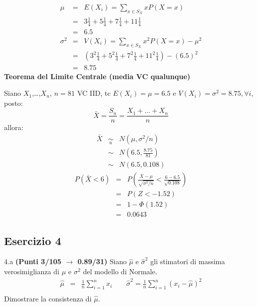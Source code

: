 \documentclass[
  11pt,
]{book}
\theoremstyle{mytheoremstyle}
\theoremstyle{mydefstyle}
\newenvironment{sol}
  {
  \begin{tcolorbox}[enhanced,breakable,arc=0.1mm,boxrule=1pt,colback=white,colframe=iblue,
  title=\bf \fontfamily{lmss}\selectfont \hspace{.5 cm} Soluzione,drop fuzzy shadow]

}{
\end{tcolorbox}
  }
\begin{document}
\begin{sol}
\begin{eqnarray*} \mu &=& E(X_i) = \sum_{x\in S_X}x P(X=x)\\ 
 &=&  3  \frac { 1 }{ 4 }+ 5  \frac { 1 }{ 4 }+ 7  \frac { 1 }{ 4 }+ 11  \frac { 1 }{ 4 } \\ 
            &=& 6.5 \\ 
 \sigma^2 &=& V(X_i) = \sum_{x\in S_X}x^2 P(X=x)-\mu^2\\ 
 &=&\left(  3  ^2\frac { 1 }{ 4 }+ 5  ^2\frac { 1 }{ 4 }+ 7  ^2\frac { 1 }{ 4 }+ 11  ^2\frac { 1 }{ 4 } \right)-( 6.5 )^2\\ 
            &=& 8.75 
\end{eqnarray*}
\textbf{Teorema del Limite Centrale (media VC qualunque)}

Siano \(X_1\),\ldots,\(X_n\), \(n=81\) VC IID, tc \(E(X_i)=\mu=6.5\) e \(V(X_i)=\sigma^2=8.75,\forall i\), posto:
\[
      \bar X=\frac{S_n}n =\frac{X_1 + ... + X_n}n
      \]
allora:\begin{eqnarray*}
  \bar X & \mathop{\sim}\limits_{a}& N(\mu,\sigma^2/n) \\
     &\sim & N\left(6.5,\frac{8.75}{81}\right) \\
     &\sim & N(6.5,0.108)
  \end{eqnarray*}\begin{eqnarray*}
      P( \bar X   <   6 ) 
        &=& P\left(  \frac { \bar X  -  \mu }{ \sqrt{\sigma^2/n} }  <  \frac { 6  -  6.5 }{\sqrt{ 0.108 }} \right)  \\
                 &=& P\left(  Z   <   -1.52 \right) \\    
                 &=&  1-\Phi( 1.52 ) \\ &=&  0.0643 
      \end{eqnarray*}

\end{sol}

\subsection{Esercizio 4}\label{esercizio-4-30}

4.a \textbf{(Punti 3/105 \(\rightarrow\) 0.89/31)} Siano \(\hat \mu\) e \(\hat\sigma^2\) gli stimatori di massima verosimiglianza di \(\mu\) e \(\sigma^2\) del modello di Normale.
\begin{eqnarray*}
  \hat\mu &=&  \frac 1n\sum_{i=1}^nx_i \qquad \hat\sigma^2 =  \frac 1n\sum_{i=1}^n(x_i-\hat\mu)^2\\
\end{eqnarray*}
Dimostrare la consistenza di \(\hat\mu\).
\end{document}
